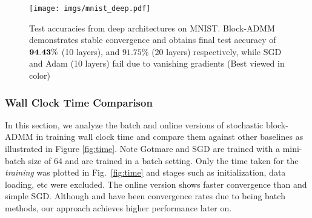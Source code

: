\begin{figure}[ht]
\begin{center}
\centerline{
\texttt{[image: imgs/mnist\_deep.pdf]}
}
\caption{Test accuracies from deep architectures on MNIST. Block-ADMM demonstrates stable convergence and obtains final test accuracy of $\bf 94.43\%$ (10 layers), and $91.75\%$ (20 layers) respectively, while SGD and Adam (10 layers) fail due to vanishing gradients (Best viewed in color)}
\label{fig:mnist_deep}
\end{center}
\end{figure}



\subsubsection{Wall Clock Time Comparison}\label{time_cmp}

In this section, we analyze the batch and online versions of stochastic block-ADMM in training wall clock time and compare them against other baselines as illustrated in Figure \ref{fig:time}.  %
Note Gotmare \etal and SGD are trained with a mini-batch size of 64 and \cite{zeng2018global,wang2019admm} are trained in a batch setting. Only the time taken for the \emph{training} was plotted in Fig.~\ref{fig:time} and stages such as initialization, data loading, etc were excluded. The online version shows faster convergence than \cite{gotmare2018decoupling} and simple SGD. Although \cite{zeng2018global} and \cite{wang2019global} have been convergence rates due to being batch methods, our approach achieves higher performance later on.%



